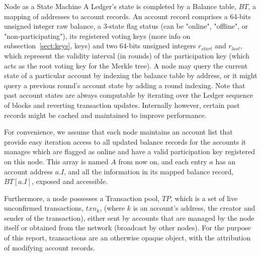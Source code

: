 \documentclass[10pt,a4paper]{article}
\begin{document}
\begin{section}{Node as a State Machine}
A Ledger's state is completed by a Balance table, $BT$, a mapping of addresses to account records.
An account record comprises a 64-bits unsigned integer raw balance, a 3-state flag status (can be 
"online", "offline", or "non-participating"), its registered voting keys (more info on subsection~\ref{sect:keys}, keys) and 
two 64-bits unsigned integers $r_{start}$ and $r_{last}$, which represent the validity interval (in rounds)
of the participation key (which acts as the root voting key for the Merkle tree).
A node may query the current state of a particular account by indexing the balance table by address, or it might
query a previous round's account state by adding a round indexing. Note that past account states are 
always computable by iterating over the Ledger sequence of blocks and reverting transaction updates. Internally
however, certain past records might be cached and maintained to improve performance.

For convenience, we assume that each node maintains an account list that provide easy iteration access to all 
updated balance records for the accounts it manages which are flagged as online and have a valid participation 
key registered on this node. 
This array is named $A$ from now on, and each entry $a$ has an account address $a.I$, and all the information
in its mapped balance record, $BT[a.I]$, exposed and accessible.

Furthermore, a node possesses a Transaction pool, $TP$, which is a set of live unconfirmed transactions, $txn_k$, (where 
$k$ is an account's address, the creator and sender of the transaction), either
sent by accounts that are managed by the node itself or obtained from the network (broadcast by other nodes).
For the purpose of this report, transactions are an otherwise opaque object, with the attribution of modifying
account records.


\end{section}
\end{document}

